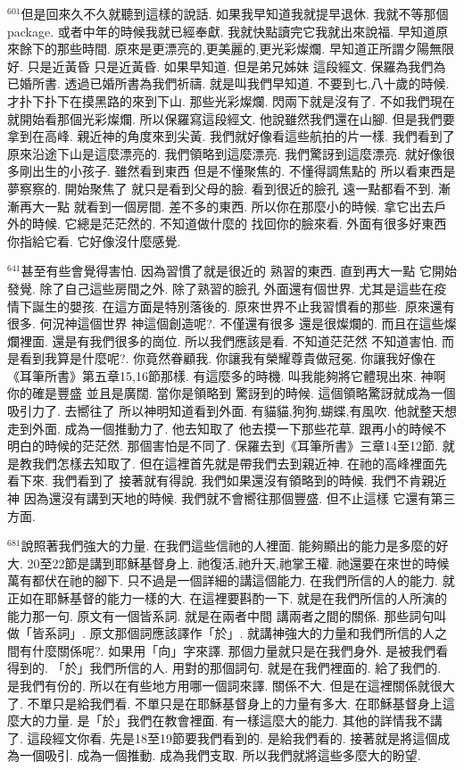 \documentclass{book}
\begin{document}
$^{601}$但是回來久不久就聽到這樣的說話.
如果我早知道我就提早退休.
我就不等那個package.
或者中年的時候我就已經奉獻.
我就快點讀完它我就出來說福.
早知道原來餘下的那些時間.
原來是更漂亮的,更美麗的,更光彩燦爛.
早知道正所謂夕陽無限好.
只是近黃昏 只是近黃昏.
如果早知道.
但是弟兄姊妹 這段經文.
保羅為我們為已婚所書.
透過已婚所書為我們祈禱.
就是叫我們早知道.
不要到七,八十歲的時候.
才扑下扑下在摸黑路的來到下山.
那些光彩燦爛.
閃兩下就是沒有了.
不如我們現在就開始看那個光彩燦爛.
所以保羅寫這段經文.
他說雖然我們還在山腳.
但是我們要拿到在高峰.
親近神的角度來到尖黃.
我們就好像看這些航拍的片一樣.
我們看到了原來沿途下山是這麼漂亮的.
我們領略到這麼漂亮.
我們驚訝到這麼漂亮.
就好像很多剛出生的小孩子.
雖然看到東西 但是不懂聚焦的.
不懂得調焦點的 所以看東西是夢察察的.
開始聚焦了 就只是看到父母的臉.
看到很近的臉孔 遠一點都看不到.
漸漸再大一點 就看到一個房間.
差不多的東西.
所以你在那麼小的時候.
拿它出去戶外的時候.
它總是茫茫然的.
不知道做什麼的 找回你的臉來看.
外面有很多好東西 你指給它看.
它好像沒什麼感覺.

$^{641}$甚至有些會覺得害怕.
因為習慣了就是很近的 熟習的東西.
直到再大一點 它開始發覺.
除了自己這些房間之外.
除了熟習的臉孔 外面還有個世界.
尤其是這些在疫情下誕生的嬰孩.
在這方面是特別落後的.
原來世界不止我習慣看的那些.
原來還有很多.
何況神這個世界 神這個創造呢?.
不僅還有很多 還是很燦爛的.
而且在這些燦爛裡面.
還是有我們很多的崗位.
所以我們應該是看.
不知道茫茫然 不知道害怕.
而是看到我算是什麼呢?.
你竟然眷顧我.
你讓我有榮耀尊貴做冠冕.
你讓我好像在《耳筆所書》第五章15,16節那樣.
有這麼多的時機.
叫我能夠將它體現出來.
神啊 你的確是豐盛 並且是廣闊.
當你是領略到 驚訝到的時候.
這個領略驚訝就成為一個吸引力了.
去嚮往了 所以神明知道看到外面.
有貓貓,狗狗,蝴蝶,有風吹.
他就整天想走到外面.
成為一個推動力了.
他去知取了 他去摸一下那些花草.
跟再小的時候不明白的時候的茫茫然.
那個害怕是不同了.
保羅去到《耳筆所書》三章14至12節.
就是教我們怎樣去知取了.
但在這裡首先就是帶我們去到親近神.
在祂的高峰裡面先看下來.
我們看到了 接著就有得說.
我們如果還沒有領略到的時候.
我們不肯親近神 因為還沒有講到天地的時候.
我們就不會嚮往那個豐盛.
但不止這樣 它還有第三方面.

$^{681}$說照著我們強大的力量.
在我們這些信祂的人裡面.
能夠顯出的能力是多麼的好大.
20至22節是講到耶穌基督身上.
祂復活,祂升天,祂掌王權.
祂還要在來世的時候萬有都伏在祂的腳下.
只不過是一個詳細的講這個能力.
在我們所信的人的能力.
就正如在耶穌基督的能力一樣的大.
在這裡要斟酌一下.
就是在我們所信的人所演的能力那一句.
原文有一個皆系詞.
就是在兩者中間 講兩者之間的關係.
那些詞句叫做「皆系詞」.
原文那個詞應該譯作「於」.
就講神強大的力量和我們所信的人之間有什麼關係呢?.
如果用「向」字來譯.
那個力量就只是在我們身外.
是被我們看得到的.
「於」我們所信的人.
用對的那個詞句.
就是在我們裡面的.
給了我們的.
是我們有份的.
所以在有些地方用哪一個詞來譯.
關係不大.
但是在這裡關係就很大了.
不單只是給我們看.
不單只是在耶穌基督身上的力量有多大.
在耶穌基督身上這麼大的力量.
是「於」我們在教會裡面.
有一樣這麼大的能力.
其他的詳情我不講了.
這段經文你看.
先是18至19節要我們看到的.
是給我們看的.
接著就是將這個成為一個吸引.
成為一個推動.
成為我們支取.
所以我們就將這些多麼大的盼望.
\end{document}
